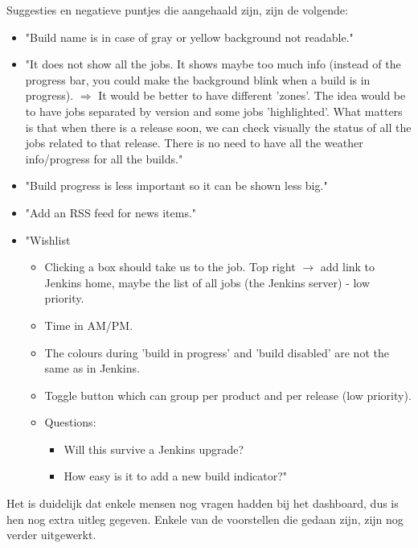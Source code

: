 \documentclass[10pt,a4paper]{article}
\begin{document}
\begin{appendices}
Suggesties en negatieve puntjes die aangehaald zijn, zijn de volgende:
\begin{itemize}
\item "Build name is in case of gray or yellow background not readable."
\item "It does not show all the jobs. It shows maybe too much info (instead of the progress bar, you could make the background blink when a build is in progress). $\Rightarrow$ It would be better to have different 'zones'. The idea would be to have jobs separated by version and some jobs 'highlighted'. What matters is that when there is a release soon, we can check visually the status of all the jobs related to that release. There is no need to have all the weather info/progress for all the builds."
\item "Build progress is less important so it can be shown less big."
\item "Add an RSS feed for news items."
\item "Wishlist
\begin{itemize}
\item Clicking a box should take us to the job. Top right $\rightarrow$ add link to Jenkins home, maybe the list of all jobs (the Jenkins server) - low priority.
\item Time in AM/PM.
\item The colours during 'build in progress' and 'build disabled' are not the same as in Jenkins.
\item Toggle button which can group per product and per release (low priority).
\item Questions:
\begin{itemize}
\item Will this survive a Jenkins upgrade?
\item How easy is it to add a new build indicator?"
\end{itemize}
\end{itemize}
\end{itemize}

Het is duidelijk dat enkele mensen nog vragen hadden bij het dashboard, dus is hen nog extra uitleg gegeven. Enkele van de voorstellen die gedaan zijn, zijn nog verder uitgewerkt.

\end{appendices}

\end{document}

